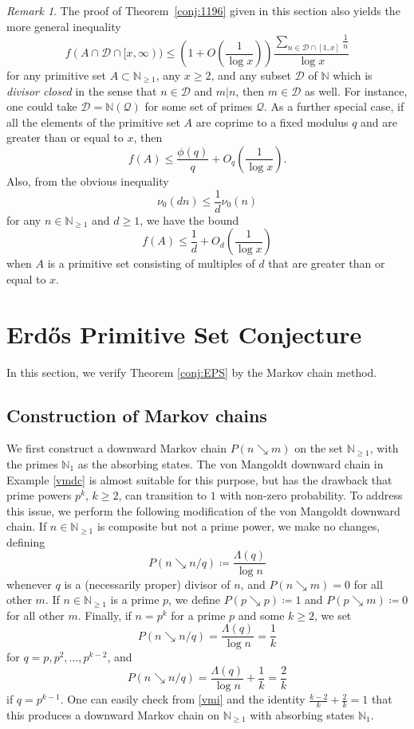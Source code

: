 \documentclass[12pt]{amsart}
\theoremstyle{definition}
\theoremstyle{remark}
\newtheorem{remark}[theorem]{Remark}
\numberwithin{equation}{section}
\newcommand{\N}{{\mathbb N}}
\newcommand{\Lam}{\Lambda}
\newcommand{\1}{{\mathbf 1}}
\newcommand{\Erdos}{{Erd\H{o}s}}
\begin{document}
\begin{remark}\label{GPT-rem-2}  The proof of Theorem~\ref{conj:1196} given in this section also yields the more general inequality
$$ f(A \cap \mathcal{D} \cap [x,\infty)) \leq \left(1 + O\left(\frac{1}{\log x}\right)\right) \frac{\sum_{n \in \mathcal{D} \cap [1,x]} \frac{1}{n}}{\log x}$$
for any primitive set $A \subset \N_{\geq 1}$, any $x \geq 2$, and any subset ${\mathcal D}$ of $\N$ which is \emph{divisor closed} in the sense that $n \in {\mathcal D}$ and $m|n$, then $m \in {\mathcal D}$ as well.  For instance, one could take ${\mathcal D} = \N({\mathcal Q})$ for some set of primes ${\mathcal Q}$.  As a further special case, if all the elements of the primitive set $A$ are coprime to a fixed modulus $q$ and are greater than or equal to $x$, then
$$ f(A) \leq \frac{\phi(q)}{q} + O_q\left(\frac{1}{\log x}\right).$$
Also, from the obvious inequality
\begin{equation}\label{nu-dilate}
\nu_0(dn) \leq \frac{1}{d} \nu_0(n)
\end{equation}
for any $n \in \N_{\geq 1}$ and $d \geq 1$, we have the bound
$$ f(A) \leq \frac{1}{d} + O_d\left(\frac{1}{\log x}\right)$$
when $A$ is a primitive set consisting of multiples of $d$ that are greater than or equal to $x$.
\end{remark}

\section{\Erdos{} Primitive Set Conjecture}\label{EPS-sec}

In this section, we verify Theorem \ref{conj:EPS} by the Markov chain method.

\subsection{Construction of Markov chains}

We first construct a downward Markov chain $P(n \searrow m)$ on the set $\N_{\geq 1}$, with the primes $\N_1$ as the absorbing states.  The von Mangoldt downward chain
in Example \ref{vmdc} is almost suitable for this purpose, but has the drawback that prime powers $p^k$, $k \geq 2$, can transition to $1$ with non-zero probability.  To address this issue, we perform the following modification of the von Mangoldt downward chain.  If $n \in \N_{\geq 1}$ is composite but not a prime power, we make no changes, defining
$$ P(n \searrow n/q) \coloneq \frac{\Lam(q)}{\log n}$$
whenever $q$ is a (necessarily proper) divisor of $n$, and $P(n \searrow m)=0$ for all other $m$.  If $n \in \N_{\geq 1}$ is a prime $p$, we define $P(p \searrow p) \coloneq 1$ and $P(p \searrow m) \coloneq 0$ for all other $m$. Finally, if $n = p^k$ for a prime $p$ and some $k \geq 2$, we set
$$ P(n \searrow n/q) = \frac{\Lam(q)}{\log n} = \frac{1}{k}$$
for $q = p, p^2, \dots, p^{k-2}$, and
$$ P(n \searrow n/q) = \frac{\Lam(q)}{\log n} + \frac{1}{k} = \frac{2}{k}$$
if $q = p^{k-1}$.  One can easily check from \eqref{vmi} and the identity $\tfrac{k-2}{k}+\tfrac{2}{k}=1$ that this produces a downward Markov chain on $\N_{\geq 1}$ with absorbing states $\N_1$.
\end{document}
